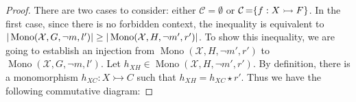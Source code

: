 \begin{proof}
    \label{antipattern:proof:lem:xglnotmlp_xhlnotmrp}
    There are two cases to consider: either $\mathcal{C} \mathop{=}\emptyset$ or $\mathcal{C} \mathop{=} \{f:X \rightarrowtail F\}$. 
     In the first case, since there is no forbidden context, the inequality is equivalent to $
        |\operatorname{Mono}(\mathcal{X},G,\lnot m, l')| \geq
        |\operatorname{Mono}(\mathcal{X},H,\lnot m', r')|$.
    To show this inequality, we are going to establish an injection from $\operatorname{Mono}(\mathcal{X},H,\lnot m', r')$ to $\operatorname{Mono}(\mathcal{X},G,\lnot m, l')$. Let $h_{XH} \mathop{\in} \operatorname{Mono}(\mathcal{X},H,\lnot m', r')$. By definition, there is a monomorphism $h_{XC}:X \rightarrowtail C$ such that $h_{XH} \mathop{=} h_{XC} \mathop{\star} r'$. Thus we have the following commutative diagram:


\end{proof}
